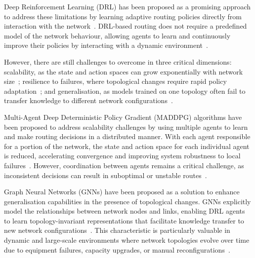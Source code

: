 \documentclass[10pt,journal,comsoc]{IEEEtran}
\begin{document}
Deep Reinforcement Learning (DRL) has been proposed as a promising approach to address these limitations by learning adaptive routing policies directly from interaction with the network~\cite{abrol2024deep}. DRL-based routing does not require a predefined model of the network behaviour, allowing agents to learn and continuously improve their policies by interacting with a dynamic environment~\cite{he2023routing,casas2020intelligent}.

However, there are still challenges to overcome in three critical dimensions: scalability, as the state and action spaces can grow exponentially with network size~\cite{xiao2021leveraging,liu2023scalable}; resilience to failures, where topological changes require rapid policy adaptation~\cite{liu2023scalable,rao2024dar,bhavanasi2022routing}; and generalisation, as models trained on one topology often fail to transfer knowledge to different network configurations~\cite{he2023routing,bhavanasi2022routing}.

Multi-Agent Deep Deterministic Policy Gradient (MADDPG) algorithms have been proposed to address scalability challenges by using multiple agents to learn and make routing decisions in a distributed manner. With each agent responsible for a portion of the network, the state and action space for each individual agent is reduced, accelerating convergence and improving system robustness to local failures~\cite{bhavanasi2022routing,geng2020multi,li2022applications}. However, coordination between agents remains a critical challenge, as inconsistent decisions can result in suboptimal or unstable routes~\cite{feriani2021single,ding2024multi}.

Graph Neural Networks (GNNs) have been proposed as a solution to enhance generalisation capabilities in the presence of topological changes. GNNs explicitly model the relationships between network nodes and links, enabling DRL agents to learn topology-invariant representations that facilitate knowledge transfer to new network configurations~\cite{bhavanasi2022routing,he2023routing,li2022applications}. This characteristic is particularly valuable in dynamic and large-scale environments where network topologies evolve over time due to equipment failures, capacity upgrades, or manual reconfigurations~\cite{almasan2022deep}.
\end{document}
